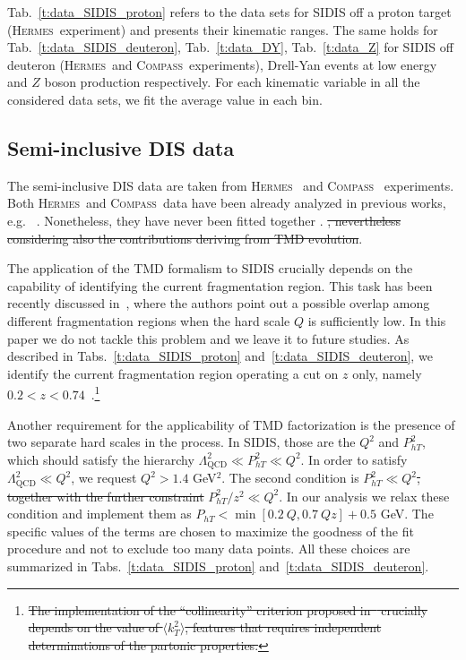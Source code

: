 \documentclass[aps,preprintnumbers,showpacs,nofootinbib,superscriptaddress,floatfix]{revtex4}
\newcommand{\AS}[1]{{\textcolor[rgb]{1,0,1}{#1}}}
\newcommand{\hermes}{\textsc{Hermes}}
\newcommand{\compass}{\textsc{Compass}}
\begin{document}
Tab.~\ref{t:data_SIDIS_proton} refers to the data sets for SIDIS off \AS{a} proton target (\hermes\ experiment) and presents their kinematic ranges. 
The same holds for Tab.~\ref{t:data_SIDIS_deuteron}, Tab.~\ref{t:data_DY}, Tab.~\ref{t:data_Z} for SIDIS off deuteron (\hermes\ and \compass\ experiments), Drell-Yan events at low energy and $Z$ boson production respectively. 
For each kinematic variable in all the considered data sets, we fit the average value in each bin.
 
\subsection{Semi-inclusive DIS data}
\label{ss:SIDIS data}

The semi-inclusive DIS data are taken from \hermes~\cite{Airapetian:2012ki} and \compass~\cite{Adolph:2013stb} experiments. 
Both \hermes\ and \compass\ data have been already analyzed in previous works, e.g.~\cite{Signori:2013mda,Anselmino:2013lza} \AS{ . Nonetheless,} they have never been fitted together \AS{ . \sout{, nevertheless considering also the contributions deriving from TMD evolution}}.

The application of the TMD formalism to SIDIS crucially depends on the capability of identifying the current fragmentation region. This task has been recently discussed in~\cite{Boglione:2016bph}, where the authors point out a possible overlap among different  fragmentation regions when the hard scale $Q$ is sufficiently low. 
In this paper we do not tackle this problem and we leave it to future studies. As described in Tabs.~\ref{t:data_SIDIS_proton} and~\ref{t:data_SIDIS_deuteron}, we identify the current fragmentation region operating a cut on $z$ only, namely $0.2 < z < 0.74$\ .\footnote{\AS{\sout{The implementation of the ``collinearity'' criterion proposed in~\cite{Boglione:2016bph} crucially depends on the value of $\langle k_T^2 \rangle$, features that requires independent determinations of the partonic properties.}}}

Another requirement for the applicability of TMD factorization is the presence of two separate hard scales in the process. In SIDIS, those are the $Q^2$ and $P_{hT}^2$, which should satisfy the hierarchy $\Lambda_{\text{QCD}}^2 \ll P_{hT}^2 \ll Q^2$. 
In order to satisfy $\Lambda_{\text{QCD}}^2 \ll Q^2$, we request $Q^2 > 1.4$ GeV$^2$. 
The second condition is \AS{\sout{$P_{hT}^2 \ll Q^2$, together with the further constraint}  $P_{hT}^2/z^2 \ll Q^2$}. In our analysis we relax
these \AS{condition} and implement them as $P_{hT} < \min[0.2\ Q, 0.7\ Qz] + 0.5$ GeV. The specific values of the terms are chosen to maximize the goodness of the fit procedure and not to exclude too many data points.
All these choices are summarized in Tabs.~\ref{t:data_SIDIS_proton} and~\ref{t:data_SIDIS_deuteron}.
\end{document}
